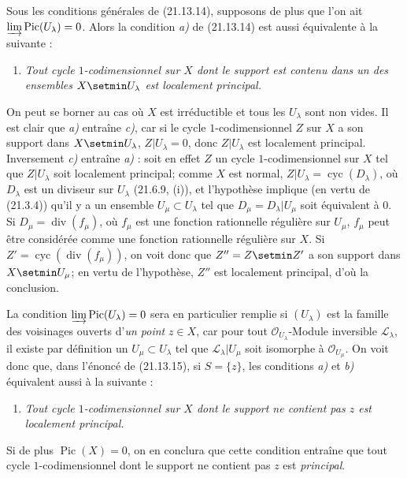\begin{remark}[21.13.16]
\label{IV.21.13.16}
Sous les conditions générales de (21.13.14), supposons de plus que l'on ait
$\varinjlim\operatorname{Pic}(U_\lambda)=0$. Alors la condition \emph{a)} de (21.13.14)
est aussi équivalente à la suivante :
\begin{enumerate}
  \item[c)] \emph{Tout cycle $1$-codimensionnel sur $X$ dont le support est contenu
  dans un des ensembles $X\setmin U_\lambda$ est localement principal.}
\end{enumerate}

On peut se borner au cas où $X$ est irréductible et tous les $U_\lambda$ sont non
vides. Il est clair que \emph{a)} entraîne \emph{c)}, car si le cycle $1$-codimensionnel $Z$ sur
$X$ a son support dans $X\setmin U_\lambda$, $Z|U_\lambda=0$, donc $Z|U_\lambda$ est
localement principal. Inversement \emph{c)} entraîne \emph{a)} : soit en effet $Z$ un cycle
$1$-codimensionnel sur $X$ tel que $Z|U_\lambda$ soit localement principal; comme $X$
est normal, $Z|U_\lambda=\operatorname{cyc}(D_\lambda)$, où $D_\lambda$ est un
diviseur sur $U_\lambda$ (21.6.9, (i)), et l'hypothèse implique (en vertu de
(21.3.4)) qu'il y a un ensemble $U_\mu\subset U_\lambda$ tel que
$D_\mu=D_\lambda|U_\mu$ soit équivalent à $0$. Si
$D_\mu=\operatorname{div}(f_\mu)$, où $f_\mu$ est une fonction rationnelle régulière
sur $U_\mu$, $f_\mu$ peut être considérée comme une fonction rationnelle régulière
sur $X$. Si $Z'=\operatorname{cyc}(\operatorname{div}(f_\mu))$, on voit donc que
$Z''=Z\setmin Z'$ a son support dans $X\setmin U_\mu$; en vertu de l'hypothèse, $Z''$ est
localement principal, d'où la conclusion.

La condition $\varinjlim\operatorname{Pic}(U_\lambda)=0$ sera en particulier remplie
si $(U_\lambda)$ est la famille des voisinages ouverts d'\emph{un point} $z\in X$,
car pour tout $\mathcal O_{U_\lambda}$-Module inversible $\mathscr L_\lambda$, il
existe par définition un $U_\mu\subset U_\lambda$ tel que
$\mathscr L_\lambda|U_\mu$ soit isomorphe à $\mathcal O_{U_\mu}$. On voit donc que,
dans l'énoncé de (21.13.15), si $S=\{z\}$, les conditions \emph{a)} et \emph{b)} équivalent
aussi à la suivante :
\begin{enumerate}
  \item[c)] \emph{Tout cycle $1$-codimensionnel sur $X$ dont le support ne contient
  pas $z$ est localement principal.}
\end{enumerate}

Si de plus $\operatorname{Pic}(X)=0$, on en conclura que cette condition entraîne que
tout cycle $1$-codimensionnel dont le support ne contient pas $z$ est \emph{principal}.
\end{remark}

